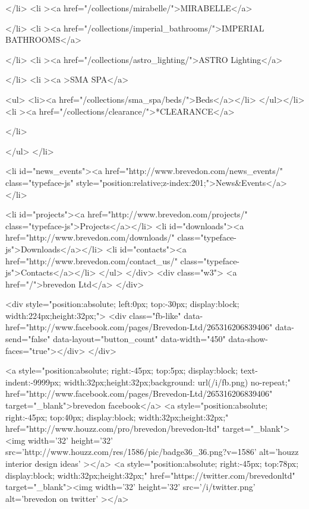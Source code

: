 	</li>
	<li ><a href="/collections/mirabelle/">MIRABELLE</a>
	
	</li>
	<li ><a href="/collections/imperial_bathrooms/">IMPERIAL BATHROOMS</a>
	
	</li>
	<li ><a href="/collections/astro_lighting/">ASTRO Lighting</a>
	
	</li>
	<li ><a >SMA SPA</a>
	
	<ul>	<li><a  href="/collections/sma_spa/beds/">Beds</a></li>
	</ul></li>
	<li ><a href="/collections/clearance/">*CLEARANCE</a>
	
	</li>
		
</ul>
</li>
				
				
				
				

				

				


					



				<li id="news_events"><a href="http://www.brevedon.com/news_events/" class="typeface-js" style="position:relative;z-index:201;">News&Events</a></li>
			
<li id="projects"><a href="http://www.brevedon.com/projects/" class="typeface-js">Projects</a></li>
				<li id="downloads"><a href="http://www.brevedon.com/downloads/" class="typeface-js">Downloads</a></li>
				<li id="contacts"><a href="http://www.brevedon.com/contact_us/" class="typeface-js">Contacts</a></li>
			</ul>
		</div>
		<div class="w3"> 
			<a href="/">brevedon Ltd</a>
		</div> 

<div style="position:absolute; left:0px; top:-30px; display:block; width:224px;height:32px;">
<div class="fb-like" data-href="http://www.facebook.com/pages/Brevedon-Ltd/265316206839406" data-send="false" data-layout="button_count" data-width="450" data-show-faces="true"></div>
</div>

<a style="position:absolute; right:-45px; top:5px; display:block; text-indent:-9999px; width:32px;height:32px;background: url(/i/fb.png) no-repeat;" href="http://www.facebook.com/pages/Brevedon-Ltd/265316206839406" target="_blank">brevedon facebook</a>
<a style="position:absolute; right:-45px; top:40px; display:block; width:32px;height:32px;" href="http://www.houzz.com/pro/brevedon/brevedon-ltd" target="_blank"><img width='32' height='32' src='http://www.houzz.com/res/1586/pic/badge36_36.png?v=1586' alt='houzz interior design ideas' ></a>
<a style="position:absolute; right:-45px; top:78px; display:block; width:32px;height:32px;" href="https://twitter.com/brevedonltd" target="_blank"><img width='32' height='32' src='/i/twitter.png' alt='brevedon on twitter' ></a>


